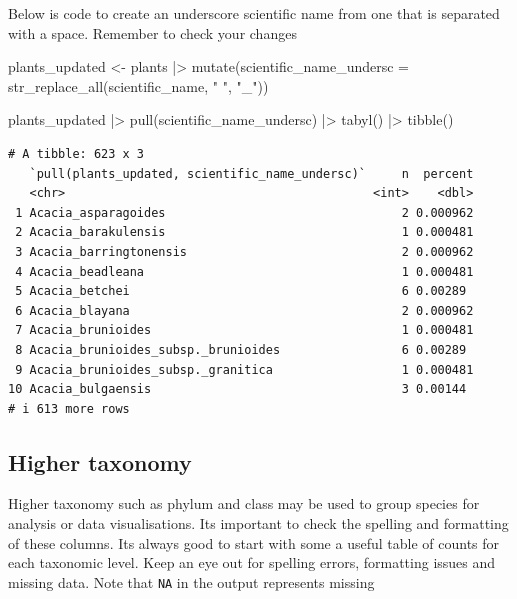 \documentclass[
  letterpaper,
  DIV=11,
  numbers=noendperiod,
  oneside]{scrreprt}
\newenvironment{Shaded}{\begin{snugshade}}{\end{snugshade}}
\newcommand{\AttributeTok}[1]{\textcolor[rgb]{0.40,0.45,0.13}{#1}}
\newcommand{\FunctionTok}[1]{\textcolor[rgb]{0.28,0.35,0.67}{#1}}
\newcommand{\NormalTok}[1]{\textcolor[rgb]{0.00,0.23,0.31}{#1}}
\newcommand{\OtherTok}[1]{\textcolor[rgb]{0.00,0.23,0.31}{#1}}
\newcommand{\SpecialCharTok}[1]{\textcolor[rgb]{0.37,0.37,0.37}{#1}}
\newcommand{\StringTok}[1]{\textcolor[rgb]{0.13,0.47,0.30}{#1}}
\begin{document}
Below is code to create an underscore scientific name from one that is
separated with a space. Remember to check your changes

\begin{Shaded}
\begin{Highlighting}[]
\NormalTok{plants\_updated }\OtherTok{\textless{}{-}}\NormalTok{ plants }\SpecialCharTok{|\textgreater{}} 
  \FunctionTok{mutate}\NormalTok{(}\AttributeTok{scientific\_name\_undersc =} \FunctionTok{str\_replace\_all}\NormalTok{(scientific\_name, }\StringTok{" "}\NormalTok{, }\StringTok{"\_"}\NormalTok{)) }

\NormalTok{plants\_updated }\SpecialCharTok{|\textgreater{}} 
  \FunctionTok{pull}\NormalTok{(scientific\_name\_undersc) }\SpecialCharTok{|\textgreater{}} 
  \FunctionTok{tabyl}\NormalTok{() }\SpecialCharTok{|\textgreater{}} 
  \FunctionTok{tibble}\NormalTok{()}
\end{Highlighting}
\end{Shaded}

\begin{verbatim}
# A tibble: 623 x 3
   `pull(plants_updated, scientific_name_undersc)`     n  percent
   <chr>                                           <int>    <dbl>
 1 Acacia_asparagoides                                 2 0.000962
 2 Acacia_barakulensis                                 1 0.000481
 3 Acacia_barringtonensis                              2 0.000962
 4 Acacia_beadleana                                    1 0.000481
 5 Acacia_betchei                                      6 0.00289 
 6 Acacia_blayana                                      2 0.000962
 7 Acacia_brunioides                                   1 0.000481
 8 Acacia_brunioides_subsp._brunioides                 6 0.00289 
 9 Acacia_brunioides_subsp._granitica                  1 0.000481
10 Acacia_bulgaensis                                   3 0.00144 
# i 613 more rows
\end{verbatim}

\hypertarget{higher-taxonomy}{%
\subsection{Higher taxonomy}\label{higher-taxonomy}}

Higher taxonomy such as phylum and class may be used to group species
for analysis or data visualisations. Its important to check the spelling
and formatting of these columns. Its always good to start with some a
useful table of counts for each taxonomic level. Keep an eye out for
spelling errors, formatting issues and missing data. Note that
\texttt{NA} in the output represents missing
\end{document}
